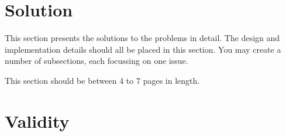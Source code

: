 \documentclass[12pt,a4paper]{article}
\begin{document}
\section{Solution} \label{sec:sol}

This section presents the solutions to the problems in detail.  The design and implementation details should all be placed in this section.  You may create a number of subsections, each focussing on one issue.  

This section should be between 4 to 7 pages in length.

\section{Validity} \label{sec:val}


\end{document}
